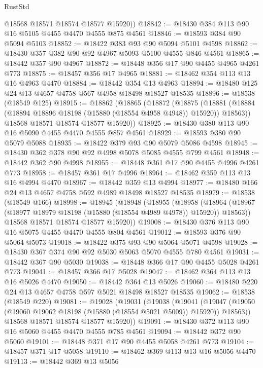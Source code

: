 \begin{lexlean}{RustStd}
\begin{coremodule}
        @18568
        @18571
        @18574
        @18577
        @15920))
@18842 := @18430 @384 @113 @90 @16 @5105 @4455 @4470 @4555 @875 @4561
@18846 := @18593 @384 @90 @5094 @5103
@18852 := @18422 @383 @93 @90 @5094 @5101 @4598
@18862 := @18430 @357 @382 @90 @92 @4967 @5093 @5100 @4555 @846 @4561
@18865 := @18442 @357 @90 @4967
@18872 := @18448 @356 @17 @90 @4455 @4965 @4261 @773
@18875 := @18457 @356 @17 @4965
@18881 := @18462 @354 @113 @13 @16 @4963 @4470
@18884 := @18442 @354 @13 @4963
@18894 := @18480 @125 @24 @13 @4657 @4758 @567 @4958 @18498 @18527 @18535
@18896 := @18538 (@18549 @125)
@18915 := @18862
    (@18865
      (@18872
        (@18875
          (@18881 (@18884 (@18894 @18896 @18198 (@15880 (@18554 @4958 @4948)) @15920)) @18563))
        @18568
        @18571
        @18574
        @18577
        @15920))
@18925 := @18430 @380 @113 @90 @16 @5090 @4455 @4470 @4555 @857 @4561
@18929 := @18593 @380 @90 @5079 @5088
@18935 := @18422 @379 @93 @90 @5079 @5086 @4598
@18945 := @18430 @362 @378 @90 @92 @4998 @5078 @5085 @4555 @799 @4561
@18948 := @18442 @362 @90 @4998
@18955 := @18448 @361 @17 @90 @4455 @4996 @4261 @773
@18958 := @18457 @361 @17 @4996
@18964 := @18462 @359 @113 @13 @16 @4994 @4470
@18967 := @18442 @359 @13 @4994
@18977 := @18480 @166 @24 @13 @4657 @4758 @592 @4989 @18498 @18527 @18535
@18979 := @18538 (@18549 @166)
@18998 := @18945
    (@18948
      (@18955
        (@18958
          (@18964 (@18967 (@18977 @18979 @18198 (@15880 (@18554 @4989 @4978)) @15920)) @18563))
        @18568
        @18571
        @18574
        @18577
        @15920))
@19008 := @18430 @376 @113 @90 @16 @5075 @4455 @4470 @4555 @804 @4561
@19012 := @18593 @376 @90 @5064 @5073
@19018 := @18422 @375 @93 @90 @5064 @5071 @4598
@19028 := @18430 @367 @374 @90 @92 @5030 @5063 @5070 @4555 @780 @4561
@19031 := @18442 @367 @90 @5030
@19038 := @18448 @366 @17 @90 @4455 @5028 @4261 @773
@19041 := @18457 @366 @17 @5028
@19047 := @18462 @364 @113 @13 @16 @5026 @4470
@19050 := @18442 @364 @13 @5026
@19060 := @18480 @220 @24 @13 @4657 @4758 @597 @5021 @18498 @18527 @18535
@19062 := @18538 (@18549 @220)
@19081 := @19028
    (@19031
      (@19038
        (@19041
          (@19047 (@19050 (@19060 @19062 @18198 (@15880 (@18554 @5021 @5009)) @15920)) @18563))
        @18568
        @18571
        @18574
        @18577
        @15920))
@19091 := @18430 @372 @113 @90 @16 @5060 @4455 @4470 @4555 @785 @4561
@19094 := @18442 @372 @90 @5060
@19101 := @18448 @371 @17 @90 @4455 @5058 @4261 @773
@19104 := @18457 @371 @17 @5058
@19110 := @18462 @369 @113 @13 @16 @5056 @4470
@19113 := @18442 @369 @13 @5056

\end{coremodule}
\end{lexlean}
